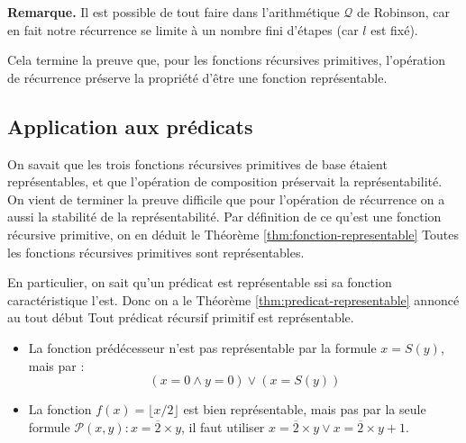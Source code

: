 \documentclass[11pt,class=report,crop=false]{standalone}
\begin{document}
\textbf{Remarque.} Il est possible de tout faire dans l'arithmétique $\mathcal{Q}$ de Robinson, car en fait notre récurrence se limite à un nombre fini d'étapes (car $l$ est fixé).

Cela termine la preuve que, pour les fonctions récursives primitives, l'opération de récurrence préserve la propriété d'être une fonction représentable.


\subsection{Application aux prédicats}


On savait que les trois fonctions récursives primitives de base étaient représentables, et que l'opération de composition préservait la représentabilité.
On vient de terminer la preuve difficile que pour l'opération de récurrence on a aussi la stabilité de la représentabilité. Par définition de ce qu'est une fonction récursive primitive, on en déduit le Théorème \ref{thm:fonction-representable} \og{}Toutes les fonctions récursives primitives sont représentables.\fg{}

En particulier, on sait qu'un prédicat est représentable ssi sa fonction caractéristique l'est. Donc on a le Théorème \ref{thm:predicat-representable}  annoncé au tout début \og{}Tout prédicat récursif primitif est représentable.\fg{}





\begin{exercicecours}

\end{exercicecours}


\begin{exercicecours}
    \begin{itemize}
        \item La fonction prédécesseur n'est pas représentable par la formule $x=S(y)$, mais par :
        \[ (x=0 \land y=0) \lor (x=S(y)) \]
        \item La fonction $f(x)=\lfloor x/2 \rfloor$ est bien représentable, mais pas par la seule formule $\mathcal{P}(x,y) : x = \overline{2} \times y$, il faut utiliser $x = \overline{2} \times y \lor x = \overline{2} \times y + 1$.
    \end{itemize}
\end{exercicecours}
 
\end{document}
